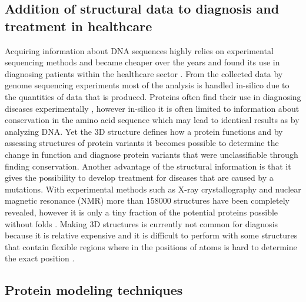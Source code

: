 \subsection{Addition of structural data to diagnosis and treatment in healthcare}
Acquiring information about DNA sequences highly relies on experimental sequencing methods and became cheaper over the years \cite{} and found its use in diagnosing patients within the healthcare sector \cite{}.
From the collected data by genome sequencing experiments most of the analysis is handled in-silico due to the quantities of data that is produced. Proteins often find their use in diagnosing diseases experimentally \cite{}, however in-silico it is often limited to information about conservation in the amino acid sequence which may lead to identical results as by analyzing DNA.
Yet the 3D structure defines how a protein functions \cite{} and by assessing structures of protein variants it becomes possible to determine the change in function and diagnose protein variants that were unclassifiable through finding conservation.
Another advantage of the structural information is that it gives the possibility to develop treatment for diseases that are caused by a mutations. 
With experimental methods such as X-ray crystallography and nuclear magnetic resonance (NMR) more than 158000 structures \cite{} have been completely revealed, however it is only a tiny fraction of the potential proteins possible without folds \cite{}.
Making 3D structures is currently not common for diagnosis because it is relative expensive and it is difficult to perform with some structures that contain flexible regions where in the positions of atoms is hard to determine the exact position \cite{}.
\newpage

\subsection{Protein modeling techniques}

